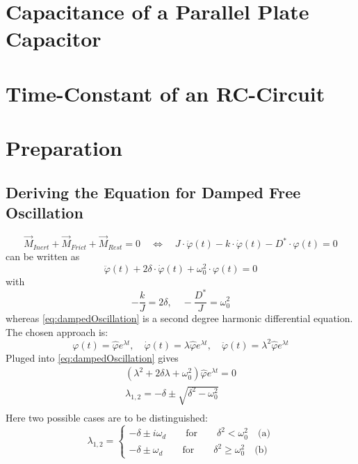 \section*{Capacitance of a Parallel Plate Capacitor}
\section*{Time-Constant of an RC-Circuit}
%
\section{Preparation}
%
\subsection*{Deriving the Equation for Damped Free Oscillation}
    \begin{equation}
        \vec{M}_{ Inert } + \vec{M}_{ Frict } + \vec{ M}_{ Rest } = 0 \quad \Leftrightarrow \quad J \cdot \ddot\varphi(t) - k \cdot \dot\varphi(t) - D^* \cdot \varphi(t) = 0
    \end{equation}
    can be written as
    \begin{equation}
        \ddot\varphi(t) + 2 \delta \cdot \dot\varphi(t) + \omega_0^2 \cdot \varphi(t) = 0
        \label{eq:dampedOscillation}
    \end{equation}
    with
    \begin{equation}
        -\frac{k}{J} = 2\delta, \quad -\frac{D^*}{J} = \omega_0^2
    \end{equation}
    whereas \cref{eq:dampedOscillation} is a second degree harmonic differential equation.
    The chosen approach is:
    \begin{equation}
        \varphi(t) = \hat{\varphi} e^{\lambda t}, \quad \dot{\varphi}(t) = \lambda \hat{\varphi} e^{\lambda t}, \quad \ddot{\varphi}(t) = \lambda^2 \hat{\varphi} e^{\lambda t}
    \end{equation}
    Pluged into \cref{eq:dampedOscillation} gives
    \begin{align}
        \left(\lambda^2 + 2\delta \lambda + \omega_0^2\right) \hat{\varphi}e^{\lambda t} = 0 \nonumber \\
        \lambda_{1,2} = -\delta \pm \sqrt{\delta^2-\omega_0^2} \nonumber \\
    \end{align}
    Here two possible cases are to be distinguished:
    \begin{equation}
        \lambda_{1,2} =
        \begin{cases}
                -\delta \pm i\omega_d \qquad \text{for} \qquad \delta^2 < \omega_0^2 \quad \text{(a)}\\
                -\delta \pm \omega_d \qquad \text{for} \qquad \delta^2 \geq \omega_0^2 \quad \text{(b)}
            \end{cases}
        \end{equation}
